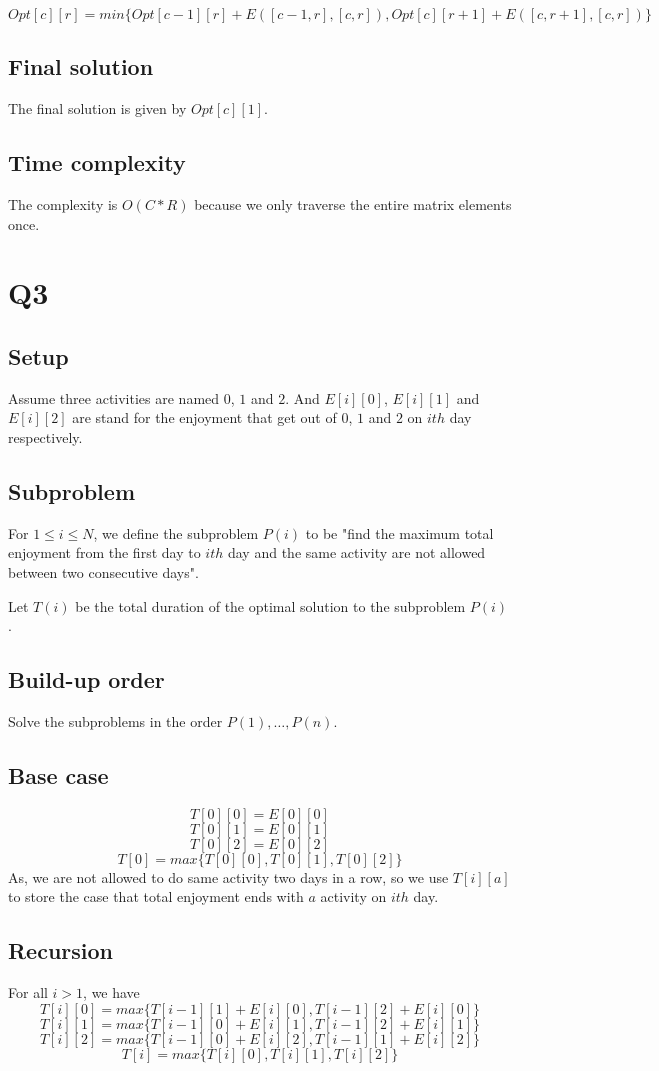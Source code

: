 \documentclass[a4paper]{article}
\begin{document}
	\[Opt[c][r] = min\{Opt[c-1][r]+E([c-1,r],[c,r]),  Opt[c][r+1]+E([c,r+1],[c,r])\}\]
	
	\subsection*{Final solution}
	The final solution is given by $Opt[c][1]$.
	
	\subsection*{Time complexity}
	The complexity is $O(C*R)$ because we only traverse the entire matrix elements once.
	
		
	\section*{Q3}
	\subsection*{Setup}
	Assume three activities are named $0$, $1$ and $2$. And $E[i][0]$, $E[i][1]$ and $E[i][2]$ are stand for the enjoyment that get out of $0$, $1$ and $2$ on $ith$ day respectively.
	\subsection*{Subproblem}
	For $1 \leq i \leq N$, we define the subproblem $P(i)$ to be "find the maximum total enjoyment from the first day to $ith$ day and the same activity are not allowed between two consecutive days".
	
	Let $T(i)$ be the total duration of the optimal solution to the subproblem $P(i)$.
	\subsection*{Build-up order}
	Solve the subproblems in the order $P(1), \dots, P(n)$.
	\subsection*{Base case}
	\[T[0][0] = E[0][0]\]
	\[T[0][1] = E[0][1]\]
	\[T[0][2] = E[0][2]\]
	\[T[0] = max\{T[0][0], T[0][1], T[0][2]\}\]
	As, we are not allowed to do same activity two days in a row, so we use $T[i][a]$ to store the case that total enjoyment ends with $a$ activity on $ith$ day.
	\subsection*{Recursion}
	For all $i>1$, we have
	\[T[i][0] = max\{T[i-1][1]+E[i][0] ,T[i-1][2]+E[i][0]\}\]
	\[T[i][1] = max\{T[i-1][0]+E[i][1] ,T[i-1][2]+E[i][1]\}\]
	\[T[i][2] = max\{T[i-1][0]+E[i][2] ,T[i-1][1]+E[i][2]\}\]
	\[T[i] = max\{T[i][0], T[i][1], T[i][2]\}\]
	
\end{document}

